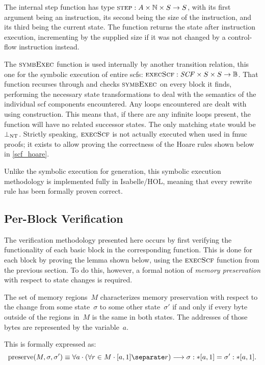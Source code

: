 The internal step function has type $\operatorname{\textsc{step}}:A\times\mathbb N\times S\rightarrow S$,%
with its first argument being an instruction, its second being the size of the instruction,
and its third being the current state.
The function returns the state after instruction execution,
incrementing  by the supplied size
if it was not changed by a control-flow instruction instead.

The $\operatorname{\textsc{symbExec}}$ function is used internally by another transition relation,
this one for the symbolic execution of entire \acp{scf}:
$\operatorname{\textsc{execScf}}:\mathit{SCF}\times S\times S\rightarrow\mathbb{B}$.
That function recurses through 
and checks $\operatorname{\textsc{symbExec}}$ on every block it finds,
performing the necessary state transformations to deal with the semantics of
the individual \ac{scf} components encountered.
Any loops encountered are dealt with using  construction.
This means that, if there are any infinite loops present,
the function will have no related successor states.
The only matching state would be $\bot_\mathrm{NT}$.
Strictly speaking, $\operatorname{\textsc{execScf}}$ is not actually executed when used in \ac{fmuc} proofs;
it exists to allow proving the correctness
of the Hoare rules shown below in \cref{scf_hoare}.

Unlike the symbolic execution for generation,
this symbolic execution methodology is implemented fully in Isabelle/HOL,
meaning that every rewrite rule has been formally proven correct.

\subsection{Per-Block Verification}\label{sse:per-block}
The verification methodology presented here occurs
by first verifying the functionality of each basic block in the corresponding function.
This is done for each block by proving the lemma shown below,
using the $\operatorname{\textsc{execScf}}$ function from the previous section.
To do this, however, a formal notion of \emph{memory preservation}
with respect to state changes is required.
\begin{definition}\label{def:mem_preserve}
  The set of memory regions~$M$ characterizes memory preservation with respect to
  the change from some state~$\sigma$ to some other state~$\sigma'$
  if and only if every byte outside of the regions in~$M$ is the same in both states.
  The addresses of those bytes are represented by the variable~$a$.

  This is formally expressed as:
  \begin{equation}
    \usage(M,\sigma,\sigma')\equiv\forall a\cdot(\forall r\in M\cdot\region{a}1\separate r)
    \longrightarrow\readmemS{\sigma}a{1}=\readmemS{\sigma'}a{1}.
  \end{equation}
\end{definition}


